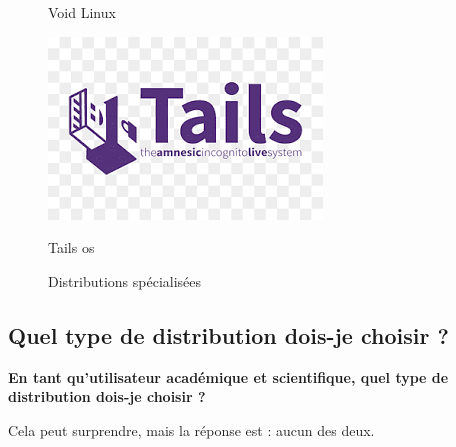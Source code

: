 \begin{itemize}[leftmargin=*,nosep]
\begin{figure}[!hbt!]
\begin{minipage}[b]{0.18\textwidth}
    \caption{Void Linux}
  \end{minipage}\hfill
  \begin{minipage}[b]{0.18\textwidth}
    \includegraphics[width=\textwidth]{images_pfe/tailsosos.png}
    \caption{Tails os}
  \end{minipage}
  
  \caption{Distributions spécialisées}
  \label{fig:distributions spécialisées}
\end{figure}
\FloatBarrier

   

  \subsection{Quel type de distribution dois-je choisir ?} 
  
\textbf{En tant qu'utilisateur académique et scientifique, quel type de distribution dois-je choisir ?}

Cela peut  surprendre, mais la réponse est : aucun des deux.


\end{itemize}
